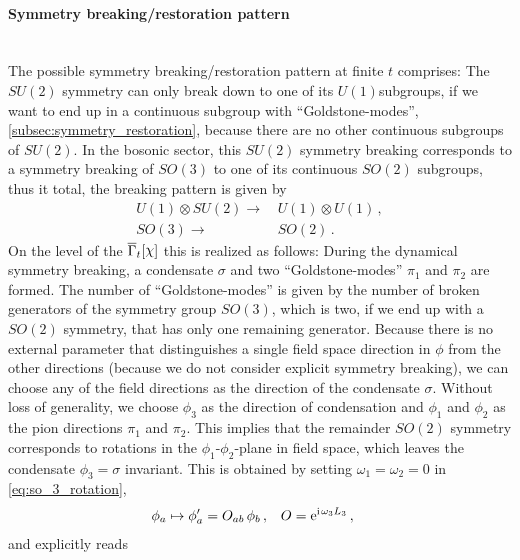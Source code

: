 \paragraph{Symmetry breaking/restoration pattern}\label{paragraph:0dSU2modelSym}\mbox{}\\%
The possible symmetry breaking/restoration pattern at finite \rgtime{} $t$ comprises:
The $SU(2)$ symmetry can only break down to one of its $U(1)$subgroups, if we want to end up in a continuous subgroup with ``Goldstone-modes'', \cf{} \cref{subsec:symmetry_restoration}, because there are no other continuous subgroups of $SU(2)$.
In the bosonic sector, this $SU(2)$ symmetry breaking corresponds to a symmetry breaking of $SO(3)$ to one of its continuous $SO(2)$ subgroups, thus it total, the breaking pattern is given by
\begin{align}
	U(1) \otimes SU(2) \rightarrow \, & U(1) \otimes U(1) \, ,\\[0.1em]
	SO(3) \rightarrow \, & SO(2) \, .
\end{align}
On the level of the \eaa{} $\FSeaa_t[\chi]$ this is realized as follows: During the dynamical symmetry breaking, a condensate $\sigma$ and two ``Goldstone-modes'' $\pi_1$ and $\pi_2$ are formed. The number of ``Goldstone-modes'' is given by the number of broken generators of the symmetry group $SO(3)$, which is two, if we end up with a $SO(2)$ symmetry, that has only one remaining generator. 
Because there is no external parameter that distinguishes a single field space direction in $\phi$ from the other directions (because we do not consider explicit symmetry breaking), we can choose any of the field directions as the direction of the condensate $\sigma$.
Without loss of generality, we choose $\phi_3$ as the direction of condensation and $\phi_1$ and $\phi_2$ as the pion directions $\pi_1$ and $\pi_2$.
This implies that the remainder $SO(2)$ symmetry corresponds to rotations in the $\phi_1$-$\phi_2$-plane in field space, which leaves the condensate $\phi_3 = \sigma$ invariant.
This is obtained by setting $\omega_{1} =\omega_{2}= 0$ in \cref{eq:so_3_rotation},
\begin{align}
	&	\phi_a \mapsto \phi^\prime_a = O_{a b} \, \phi_b \,,	&&	O = \mathrm{e}^{ \mathrm{i}\mkern1mu{}\mskip1.0mu{} \omega_3 L_3} \,,	\label{eq:o_2_rotation}
\end{align}
and explicitly reads
